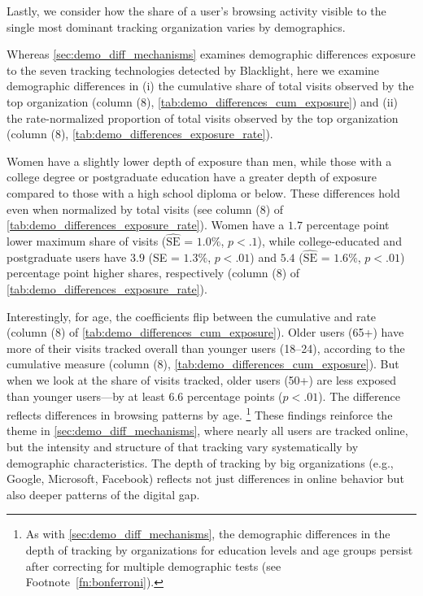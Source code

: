 \documentclass[12pt, letterpaper]{article}
\begin{document}
Lastly, we consider how the share of a user's browsing activity visible to the single most dominant tracking organization varies by demographics.

Whereas \cref{sec:demo_diff_mechanisms} examines demographic differences exposure to the seven tracking technologies detected by Blacklight, here we examine demographic differences in (i) the cumulative share of total visits observed by the top organization (column (8), \cref{tab:demo_differences_cum_exposure}) and (ii) the rate-normalized proportion of total visits observed by the top organization (column (8), \cref{tab:demo_differences_exposure_rate}).

Women have a slightly lower depth of exposure than men, while those with a college degree or postgraduate education have a greater depth of exposure compared to those with a high school diploma or below. These differences hold even when normalized by total visits (see column (8) of \cref{tab:demo_differences_exposure_rate}). Women have a $1.7$ percentage point lower maximum share of visits ($\widehat{\mathrm{SE}}$ = $1.0\%$, $p < .1$), while college-educated and postgraduate users have $3.9$ (SE = $1.3\%$, $p < .01$) and $5.4$ ($\widehat{\mathrm{SE}}$ = $1.6\%$, $p < .01$) percentage point higher shares, respectively (column (8) of \cref{tab:demo_differences_exposure_rate}).

Interestingly, for age, the coefficients flip between the cumulative and rate (column (8) of \cref{tab:demo_differences_cum_exposure}). Older users (65+) have more of their visits tracked overall than younger users (18–24), according to the cumulative measure (column (8), \cref{tab:demo_differences_cum_exposure}). But when we look at the share of visits tracked, older users (50+) are less exposed than younger users—by at least 6.6 percentage points ($p < .01$). The difference reflects differences in browsing patterns by age.%
\footnote{
    As with \cref{sec:demo_diff_mechanisms}, the demographic differences in the depth of tracking by organizations for education levels and age groups persist after correcting for multiple demographic tests (see Footnote~\ref{fn:bonferroni}).
}
These findings reinforce the theme in \cref{sec:demo_diff_mechanisms}, where nearly all users are tracked online, but the intensity and structure of that tracking vary systematically by demographic characteristics.
The depth of tracking by big organizations (e.g., Google, Microsoft, Facebook) reflects not just differences in online behavior but also deeper patterns of the digital gap.
\end{document}
